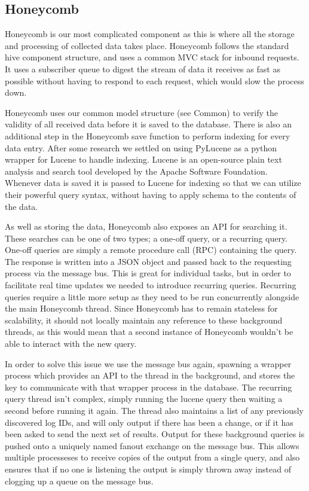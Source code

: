 \subsection{Honeycomb}

Honeycomb is our most complicated component as this is where all the storage and
processing of collected data takes place. Honeycomb follows the standard hive
component structure, and uses a common MVC stack for inbound requests. It uses a
subscriber queue to digest the stream of data it receives as fast as possible
without having to respond to each request, which would slow the process down.

Honeycomb uses our common model structure (see Common) to verify the validity of
all received data before it is saved to the database. There is also an
additional step in the Honeycomb save function to perform indexing for every
data entry. After some research we settled on using PyLucene\cite{pylucene} as a python
wrapper for Lucene\cite{lucene} to handle indexing. Lucene is an open-source plain text
analysis and search tool developed by the Apache Software Foundation. Whenever
data is saved it is passed to Lucene for indexing so that we can utilize their
powerful query syntax, without having to apply schema to the contents of the
data.

As well as storing the data, Honeycomb also exposes an API for searching it.
These searches can be one of two types; a one-off query, or a recurring query.
One-off queries are simply a remote procedure call (RPC) containing the query.
The response is written into a JSON object and passed back to the requesting
process via the message bus. This is great for individual tasks, but in order to
facilitate real time updates we needed to introduce recurring queries. Recurring
queries require a little more setup as they need to be run concurrently
alongside the main Honeycomb thread. Since Honeycomb has to remain stateless for
scalability, it should not locally maintain any reference to these background
threads, as this would mean that a second instance of Honeycomb wouldn’t be able
to interact with the new query.

In order to solve this issue we use the message bus again, spawning a wrapper
process which provides an API to the thread in the background, and stores the
key to communicate with that wrapper process in the database. The recurring
query thread isn’t complex, simply running the lucene query then waiting a
second before running it again. The thread also maintains a list of any
previously discovered log IDs, and will only output if there has been a change,
or if it has been asked to send the next set of results. Output for these
background queries is pushed onto a uniquely named fanout exchange on the
message bus. This allows multiple processeses to receive copies of the output
from a single query, and also ensures that if no one is listening the output is
simply thrown away instead of clogging up a queue on the message bus.

